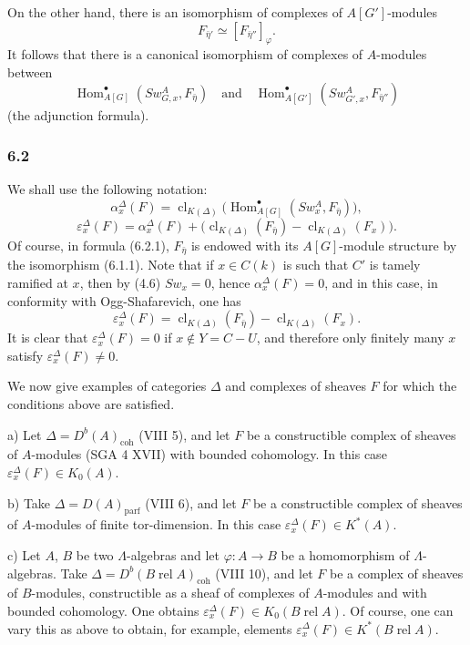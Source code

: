 \documentclass[11pt]{article}
\DeclareMathOperator{\Hom}{Hom}
\providecommand{\parf}{\mathrm{parf}}
\providecommand{\coh}{\mathrm{coh}}
\providecommand{\Hom}{\operatorname{Hom}}
\providecommand{\parf}{\mathrm{parf}}
\providecommand{\coh}{\mathrm{coh}}
\providecommand{\clK}[1]{\operatorname{cl}_{K(#1)}}
\begin{document}
On the other hand, there is an isomorphism of complexes of $A[G']$-modules
\[
F_{\bar\eta'}\simeq [F_{\bar\eta''}]_\varphi.
\]
It follows that there is a canonical isomorphism of complexes of $A$-modules between
\[
\Hom^\bullet_{A[G]}(Sw_{G,x}^A,F_{\bar\eta})
\quad\text{and}\quad
\Hom^\bullet_{A[G']}(Sw_{G',x}^A,F_{\bar\eta''})
\]
(the adjunction formula).

\subsubsection*{6.2}

We shall use the following notation:
\[
\alpha_x^\Delta(F)
=
\clK{\Delta}\bigl(\Hom^\bullet_{A[G]}(Sw_x^A,F_{\bar\eta})\bigr),
\tag{6.2.1}
\]
\[
\varepsilon_x^\Delta(F)
=
\alpha_x^\Delta(F)+
\bigl(\clK{\Delta}(F_{\bar\eta})-\clK{\Delta}(F_x)\bigr).
\tag{6.2.2}
\]
Of course, in formula (6.2.1), $F_{\bar\eta}$ is endowed with its $A[G]$-module structure by the isomorphism (6.1.1). Note that if $x\in C(k)$ is such that $C'$ is tamely ramified at $x$, then by (4.6) $Sw_x=0$, hence $\alpha_x^\Delta(F)=0$, and in this case, in conformity with Ogg-Shafarevich, one has
\[
\varepsilon_x^\Delta(F)=\clK{\Delta}(F_{\bar\eta})-\clK{\Delta}(F_x).
\tag{6.2.3}
\]
It is clear that $\varepsilon_x^\Delta(F)=0$ if $x\notin Y=C-U$, and therefore only finitely many $x$ satisfy $\varepsilon_x^\Delta(F)\ne0$.

We now give examples of categories $\Delta$ and complexes of sheaves $F$ for which the conditions above are satisfied.

a) Let $\Delta=D^b(A)_{\coh}$ (VIII 5), and let $F$ be a constructible complex of sheaves of $A$-modules (SGA 4 XVII) with bounded cohomology. In this case $\varepsilon_x^\Delta(F)\in K_0(A)$.

b) Take $\Delta=D(A)_{\parf}$ (VIII 6), and let $F$ be a constructible complex of sheaves of $A$-modules of finite tor-dimension. In this case $\varepsilon_x^\Delta(F)\in K^*(A)$.

c) Let $A$, $B$ be two $\Lambda$-algebras and let $\varphi:A\to B$ be a homomorphism of $\Lambda$-algebras. Take $\Delta=D^b(B\operatorname{ rel }A)_{\coh}$ (VIII 10), and let $F$ be a complex of sheaves of $B$-modules, constructible as a sheaf of complexes of $A$-modules and with bounded cohomology. One obtains $\varepsilon_x^\Delta(F)\in K_0(B\operatorname{ rel }A)$. Of course, one can vary this as above to obtain, for example, elements $\varepsilon_x^\Delta(F)\in K^*(B\operatorname{ rel }A)$.
\end{document}
